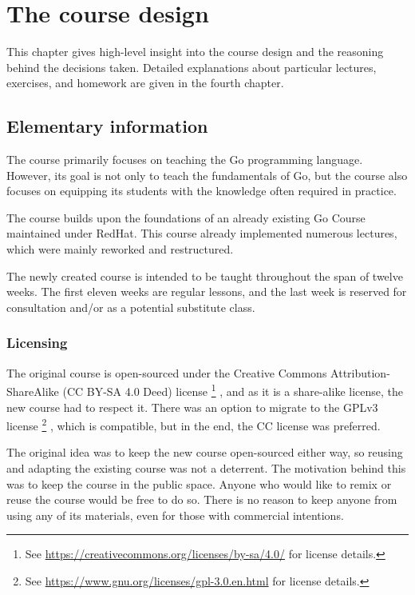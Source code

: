 \documentclass[
  digital,
  color,
  oneside,
  nosansbold,
  nocolorbold,
  lof,
  lot,
]{fithesis4}
\begin{document}
\chapter{The course design}

This chapter gives high-level insight into the course design and the reasoning behind the decisions taken. Detailed explanations about particular lectures, exercises, and homework are given in the fourth chapter.

\section{Elementary information}

The course primarily focuses on teaching the Go programming language. However, its goal is not only to teach the fundamentals of Go, but the course also focuses on equipping its students with the knowledge often required in practice.

The course builds upon the foundations of an already existing Go Course maintained under RedHat\cite{redhat-go-course}. This course already implemented numerous lectures, which were mainly reworked and restructured.

The newly created course is intended to be taught throughout the span of twelve weeks. The first eleven weeks are regular lessons, and the last week is reserved for consultation and/or as a potential substitute class.

\subsection{Licensing}

The original course is open-sourced under the Creative Commons Attribution-ShareAlike (CC BY-SA 4.0 Deed) license
\footnote{See \url{https://creativecommons.org/licenses/by-sa/4.0/} for license details.}
, and as it is a share-alike license, the new course had to respect it. There was an option to migrate to the GPLv3 license
\footnote{See \url{https://www.gnu.org/licenses/gpl-3.0.en.html} for license details.}
, which is compatible, but in the end, the CC license was preferred.

The original idea was to keep the new course open-sourced either way, so reusing and adapting the existing course was not a deterrent. The motivation behind this was to keep the course in the public space. Anyone who would like to remix or reuse the course would be free to do so. There is no reason to keep anyone from using any of its materials, even for those with commercial intentions.
\end{document}
